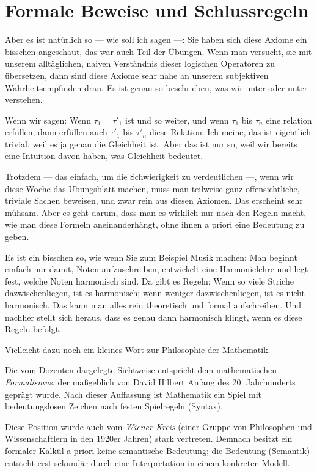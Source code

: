 \section{Formale Beweise und Schlussregeln}

\begin{spoken-clean}[00:07:14 - 00:08:40]
Aber es ist natürlich so --- wie soll ich sagen ---: Sie haben sich diese Axiome ein bisschen angeschaut, das war auch Teil der Übungen. Wenn man versucht, sie mit unserem alltäglichen, naiven Verständnis dieser logischen Operatoren zu übersetzen, dann sind diese Axiome sehr nahe an unserem subjektiven Wahrheitsempfinden dran. Es ist genau so beschrieben, was wir unter  oder unter  verstehen. 

Wenn wir sagen: Wenn $\tau_1 = \tau'_1$ ist und so weiter, und wenn $\tau_1$ bis $\tau_n$ eine relation erfüllen, dann erfüllen auch $\tau'_1$ bis $\tau'_n$ diese Relation. Ich meine, das ist eigentlich trivial, weil es ja genau die Gleichheit ist. Aber das ist nur so, weil wir bereits eine Intuition davon haben, was Gleichheit bedeutet. 

Trotzdem --- das einfach, um die Schwierigkeit zu verdeutlichen ---, wenn wir diese Woche das Übungsblatt machen, muss man teilweise ganz offensichtliche, triviale Sachen beweisen, und zwar rein aus diesen Axiomen. Das erscheint sehr mühsam. Aber es geht darum, dass man es wirklich nur nach den Regeln macht, wie man diese Formeln aneinanderhängt, ohne ihnen a priori eine Bedeutung zu geben. 

Es ist ein bisschen so, wie wenn Sie zum Beispiel Musik machen: Man beginnt einfach nur damit, Noten aufzuschreiben, entwickelt eine Harmonielehre und legt fest, welche Noten harmonisch sind. Da gibt es Regeln: Wenn so viele Striche dazwischenliegen, ist es harmonisch; wenn weniger dazwischenliegen, ist es nicht harmonisch. Das kann man alles rein theoretisch und formal aufschreiben. Und nachher stellt sich heraus, dass es genau dann harmonisch klingt, wenn es diese Regeln befolgt. 

Vielleicht dazu noch ein kleines Wort zur Philosophie der Mathematik.
\end{spoken-clean}

\begin{didactic-insight}
Die vom Dozenten dargelegte Sichtweise entspricht dem mathematischen \emph{Formalismus}, der maßgeblich von David Hilbert Anfang des 20. Jahrhunderts geprägt wurde. Nach dieser Auffassung ist Mathematik ein Spiel mit bedeutungslosen Zeichen nach festen Spielregeln (Syntax). 

Diese Position wurde auch vom \emph{Wiener Kreis} (einer Gruppe von Philosophen und Wissenschaftlern in den 1920er Jahren) stark vertreten. Demnach besitzt ein formaler Kalkül a priori keine semantische Bedeutung; die Bedeutung (Semantik) entsteht erst sekundär durch eine Interpretation in einem konkreten Modell.
\end{didactic-insight}


